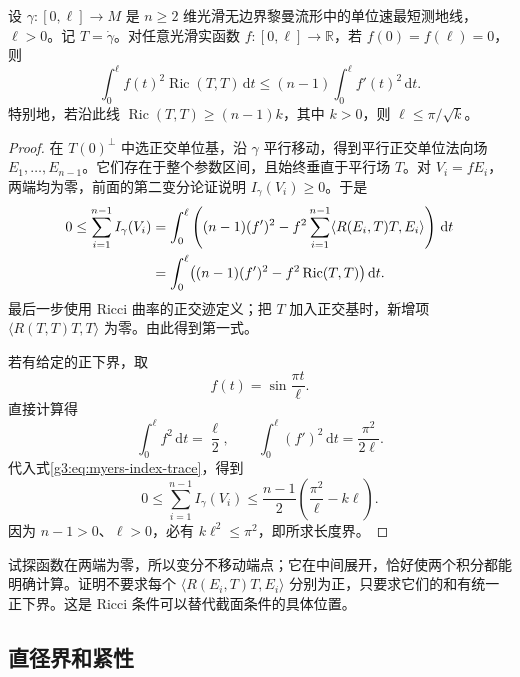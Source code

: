 \begin{lemma}\label{g3:lem:myers-index-test}
	设 \(\gamma:[0,\ell]\to M\) 是 \(n\ge2\) 维光滑无边界黎曼流形中的单位速最短测地线，\(\ell>0\)。记 \(T=\dot\gamma\)。对任意光滑实函数 \(f:[0,\ell]\to\mathbb R\)，若 \(f(0)=f(\ell)=0\)，则
	\begin{equation}\label{g3:eq:myers-weighted-index-inequality}
		\int_0^\ell f(t)^2\operatorname{Ric}(T,T)\,\mathrm{d}t
		\le(n-1)\int_0^\ell f'(t)^2\,\mathrm{d}t.
	\end{equation}
	特别地，若沿此线 \(\operatorname{Ric}(T,T)\ge(n-1)k\)，其中 \(k>0\)，则 \(\ell\le\pi/\sqrt{k}\)。
\end{lemma}
\begin{proof}
	在 \(T(0)^\perp\) 中选正交单位基，沿 \(\gamma\) 平行移动，得到平行正交单位法向场 \(E_1,\ldots,E_{n-1}\)。它们存在于整个参数区间，且始终垂直于平行场 \(T\)。对 \(V_i=fE_i\)，两端均为零，前面的第二变分论证说明 \(I_\gamma(V_i)\ge0\)。于是
	\begin{align}
		0\le\sum_{i=1}^{n-1}I_\gamma(V_i)
		&=\int_0^\ell\left((n-1)(f')^2
		-f^2\sum_{i=1}^{n-1}\langle R(E_i,T)T,E_i\rangle\right)\,\mathrm{d}t\notag\\
		&=\int_0^\ell\bigl((n-1)(f')^2
		-f^2\operatorname{Ric}(T,T)\bigr)\,\mathrm{d}t.
		\label{g3:eq:myers-index-trace}
	\end{align}
	最后一步使用 Ricci 曲率的正交迹定义；把 \(T\) 加入正交基时，新增项 \(\langle R(T,T)T,T\rangle\) 为零。由此得到第一式。

	若有给定的正下界，取
	\[
		f(t)=\sin\frac{\pi t}{\ell}.
	\]
	直接计算得
	\[
		\int_0^\ell f^2\,\mathrm{d}t=\frac\ell2,
		\qquad
		\int_0^\ell(f')^2\,\mathrm{d}t=\frac{\pi^2}{2\ell}.
	\]
	代入式\eqref{g3:eq:myers-index-trace}，得到
	\begin{equation}\label{g3:eq:myers-sine-estimate}
		0\le\sum_{i=1}^{n-1}I_\gamma(V_i)
		\le\frac{n-1}{2}\left(\frac{\pi^2}{\ell}-k\ell\right).
	\end{equation}
	因为 \(n-1>0\)、\(\ell>0\)，必有 \(k\ell^2\le\pi^2\)，即所求长度界。
\end{proof}

试探函数在两端为零，所以变分不移动端点；它在中间展开，恰好使两个积分都能明确计算。证明不要求每个 \(\langle R(E_i,T)T,E_i\rangle\) 分别为正，只要求它们的和有统一正下界。这是 Ricci 条件可以替代截面条件的具体位置。

\subsection{直径界和紧性}
\label{g3:subsec:0801:02}

